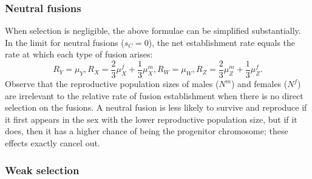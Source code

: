 \subsubsection{Neutral fusions}
When selection is negligible, the above formulae can be simplified substantially. In the limit for neutral fusions ($s_C=\text{0}$), the net establishment rate equals the rate at which each type of fusion arises: 
\begin{subequations}
\begin{equation}
R_Y=\mu_Y,
\end{equation}
\begin{equation}
R_X=\frac{\text{2}}{\text{3}}\mu^f_X + \frac{\text{1}}{\text{3}}\mu^m_X,
\end{equation}
\begin{equation}
R_W=\mu_W,
\end{equation}
\begin{equation}
R_Z=\frac{\text{2}}{\text{3}}\mu^m_Z + \frac{\text{1}}{\text{3}}\mu^f_Z.
\end{equation}
\end{subequations}
Observe that the reproductive population sizes of males ($N^m$) and females ($N^f$) are irrelevant to the relative rate of fusion establishment when there is no direct selection on the fusions. A neutral fusion is less likely to survive and reproduce if it first appears in the sex with the lower reproductive population size, but if it does, then it has a higher chance of being the progenitor chromosome; these effects exactly cancel out.

\subsubsection{Weak selection}

